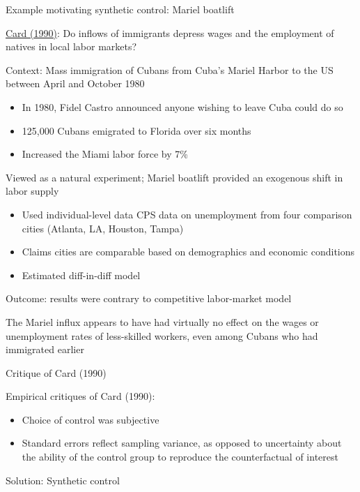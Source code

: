 \documentclass[compress, 8pt]{beamer}
\begin{document}
\begin{frame}{Example motivating synthetic control: Mariel boatlift}

\href{https://www.jstor.org/stable/2523702}{Card (1990)}: Do inflows of immigrants depress wages and the employment of natives in local labor markets?


\vspace{2ex} 
Context: Mass immigration of Cubans from Cuba's Mariel Harbor to the US between April and October 1980
\begin{itemize}
    \item In 1980, Fidel Castro announced anyone wishing to leave Cuba could do so

    \item 125,000 Cubans emigrated to Florida over six months

    \item Increased the Miami labor force by 7\%
\end{itemize}

\vspace{2ex}
Viewed as a natural experiment; Mariel boatlift provided an exogenous shift in labor supply
\begin{itemize}
    \item Used individual-level data CPS data on unemployment from four comparison cities (Atlanta, LA, Houston, Tampa)
    \item Claims cities are comparable based on demographics and economic conditions
    \item Estimated diff-in-diff model
\end{itemize}

\vspace{2ex}
Outcome: results were contrary to competitive labor-market model
\begin{displayquote}[]
The Mariel influx appears to have had virtually no effect on the wages or unemployment rates of less-skilled workers, even among Cubans who had immigrated earlier
\end{displayquote}

\end{frame}

\begin{frame}{Critique of Card (1990)}

Empirical critiques of Card (1990):
\begin{itemize}
    \item Choice of control was subjective
    \item Standard errors reflect sampling variance, as opposed to uncertainty about the ability of the control group to reproduce the counterfactual of interest
\end{itemize}
Solution: Synthetic control
\end{frame}
\end{document}
